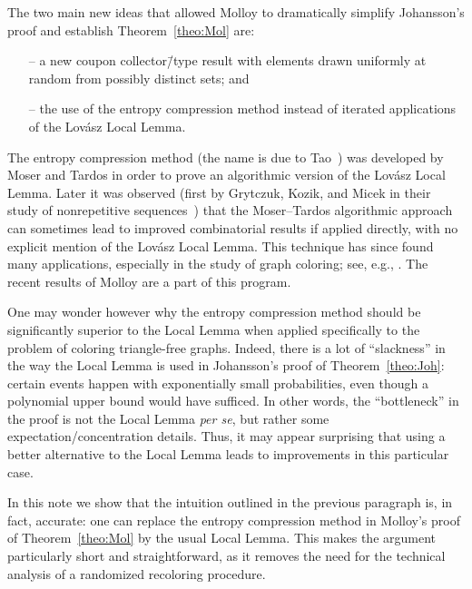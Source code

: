 \documentclass[11pt, reqno, psamsfonts]{amsart}
\theoremstyle{definition}
\theoremstyle{remark}
\newcommand{\0}{\varnothing}
\numberwithin{equation}{section}
\begin{document}
	The two main new ideas that allowed Molloy to dramatically simplify Johansson's proof and establish Theorem~\ref{theo:Mol} are:
	\begin{itemize}
		\item[--] a new coupon collector\=/type result \cite[Lemma~7]{Mol17} with elements drawn uniformly at random from possibly distinct sets; and
		\item[--] the use of the entropy compression method instead of iterated applications of the Lov\'{a}sz Local Lemma.
	\end{itemize}
	
	The entropy compression method (the name is due to Tao~\cite{Tao}) was developed by Moser and Tardos in order to prove an algorithmic version of the Lov\'asz Local Lemma. Later it was observed (first by Grytczuk, Kozik, and Micek in their study of nonrepetitive sequences~\cite{Grytczuk}) that the  Moser--Tardos algorithmic approach can sometimes lead to improved combinatorial results if applied directly, with no explicit mention of the Lov\'asz Local Lemma. This technique has since found many applications, especially in the study of graph coloring; see, e.g., \cite{Esperet, BCGR, Duj}. The recent results of Molloy are a part of this program.
	
	One may wonder however why the entropy compression method should be significantly superior to the Local Lemma when applied specifically to the problem of coloring triangle-free graphs. Indeed, there is a lot of ``slackness'' in the way the Local Lemma is used in Johansson's proof of Theorem~\ref{theo:Joh}: certain events happen with exponentially small probabilities, even though a polynomial upper bound would have sufficed. In other words, the ``bottleneck'' in the proof is not the Local Lemma \emph{per se}, but rather some expectation/concentration details. Thus, it may appear surprising that using a better alternative to the Local Lemma leads to improvements in this particular case.
	
	In this note we show that the intuition outlined in the previous paragraph is, in fact, accurate: one can replace the entropy compression method in Molloy's proof of Theorem~\ref{theo:Mol} by the usual Local Lemma. This makes the argument particularly short and straightforward, as it removes the need for the technical analysis of a randomized recoloring procedure.
	
\end{document}
